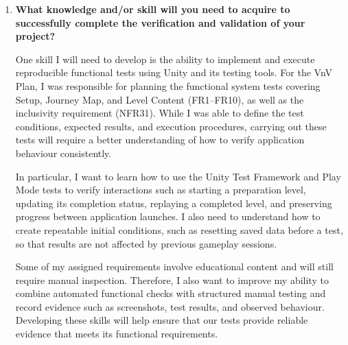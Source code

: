 \documentclass[10pt,titlepage]{article}
\begin{document}
\begin{enumerate}
    To address these issues, we discussed our concerns with
    our TA, Rashad, who recommended that we communicate our
    situation and questions to the course staff for further
    guidance. We also began reconsidering our planned Custom
    Documents, identifying a Cognitive Walkthrough Report or
    Wireframe Report as possible alternatives for the Fall
    semester. For the VnV Plan, we adjusted our proposed
    validation activities to focus on internal reviews,
    peer evaluations using child and caregiver personas,
    and feedback from our supervisor where feasible.

    Although these changes allowed us to continue planning
    the deliverable, some uncertainty remains regarding
    the final selection of our Custom Documents and the
    validation activities we can realistically perform.
    This experience highlighted the importance of
    establishing clear expectations with supervisors
    early in the project and communicating potential
    constraints before they affect planned deliverables.


    \item \textbf{What knowledge and/or skill will you need to acquire
    to successfully complete the verification and validation of
    your project?}

    One skill I will need to develop is the ability to implement
    and execute reproducible functional tests using Unity and
    its testing tools. For the VnV Plan, I was responsible for
    planning the functional system tests covering Setup,
    Journey Map, and Level Content (FR1--FR10), as well as
    the inclusivity requirement (NFR31). While I was able
    to define the test conditions, expected results, and
    execution procedures, carrying out these tests will
    require a better understanding of how to verify
    application behaviour consistently.

    In particular, I want to learn how to use the Unity
    Test Framework and Play Mode tests to verify interactions
    such as starting a preparation level, updating its
    completion status, replaying a completed level, and
    preserving progress between application launches.
    I also need to understand how to create repeatable
    initial conditions, such as resetting saved data
    before a test, so that results are not affected by
    previous gameplay sessions.

    Some of my assigned requirements involve educational
    content and will still require manual inspection.
    Therefore, I also want to improve my ability to
    combine automated functional checks with structured
    manual testing and record evidence such as screenshots,
    test results, and observed behaviour. Developing these
    skills will help ensure that our tests provide reliable
    evidence that \progname{} meets its functional requirements.



\end{enumerate}
\end{document}
